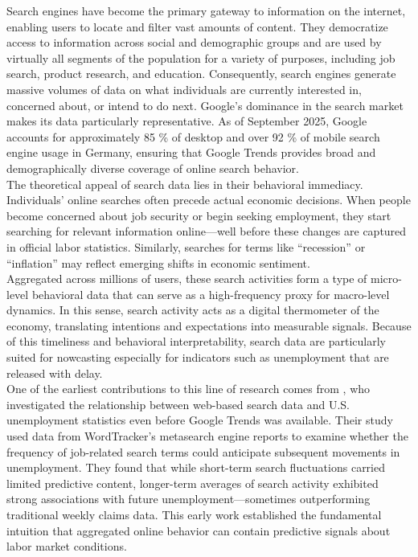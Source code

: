 \documentclass[12pt,a4paper]{article}
\begin{document}
Search engines have become the primary gateway to information on the internet, enabling users to locate and filter vast amounts of content.
They democratize access to information across social and demographic groups and are used by virtually all segments of the population for a variety of purposes, including job search, product research, and education.
Consequently, search engines generate massive volumes of data on what individuals are currently interested in, concerned about, or intend to do next.
Google’s dominance in the search market makes its data particularly representative.
As of September 2025, Google accounts for approximately 85 \% of desktop and over 92 \% of mobile search engine usage in Germany, ensuring that Google Trends provides broad and demographically diverse coverage of online search behavior.\\
The theoretical appeal of search data lies in their behavioral immediacy. Individuals’ online searches often precede actual economic decisions.
When people become concerned about job security or begin seeking employment, they start searching for relevant information online—well before these changes are captured in official labor statistics.
Similarly, searches for terms like “recession” or “inflation” may reflect emerging shifts in economic sentiment.\\
Aggregated across millions of users, these search activities form a type of micro-level behavioral data that can serve as a high-frequency proxy for macro-level dynamics.
In this sense, search activity acts as a digital thermometer of the economy, translating intentions and expectations into measurable signals. Because of this timeliness and behavioral interpretability, search data are particularly suited for nowcasting especially for indicators such as unemployment that are released with delay.
\\
One of the earliest contributions to this line of research comes from \textcite{ettrege}, who investigated the relationship between web-based search data and U.S. unemployment statistics even before Google Trends was available.
Their study used data from WordTracker’s metasearch engine reports to examine whether the frequency of job-related search terms could anticipate subsequent movements in unemployment.
They found that while short-term search fluctuations carried limited predictive content, longer-term averages of search activity exhibited strong associations with future unemployment—sometimes outperforming traditional weekly claims data.
This early work established the fundamental intuition that aggregated online behavior can contain predictive signals about labor market conditions.\\
\end{document}
